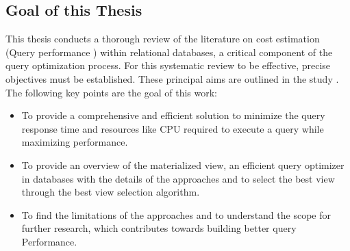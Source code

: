 \subsection{Goal of this Thesis}
\normalsize
This thesis conducts a thorough review of the literature on cost estimation (Query performance ) within relational databases, a critical component of the query optimization process. For this systematic review to be effective, precise objectives must be established. These principal aims are outlined in the study \cite{CostEstimation}. The following key points are the goal of this work:\vspace{.4cm}

\begin{itemize}
   \item To provide a comprehensive and efficient solution to minimize the query response time and resources like CPU required to execute a query while maximizing performance.
   \item To provide an overview of the materialized view, an efficient query optimizer in databases with the details of the approaches and to select the best view through the best view selection algorithm.
  \item To find the limitations of the approaches and to understand the scope for further research, which contributes towards building better query Performance. %
\end{itemize}


\begin{comment}

\subsection{Structure of the Thesis }
The following sections focus on the objectives of the systematic literature. In section 2, we will provide a background of materialized views on databases. It includes an overview of query processing, query optimization, and cost estimation.\vspace{.4cm}

In Section 3, the Methodology section, we will discuss the systematic approach to investigate and implement materialized views for query optimization in a database system, including the specific steps, tools, and techniques used to demonstrate the effectiveness of materialized views.\vspace{.4cm}

At the end of the thesis, we will discuss limitations and future work related to this topic that can be conducted.



\centering\textbf{As you mentioned earlier, i don't use it here }
\end{comment}


